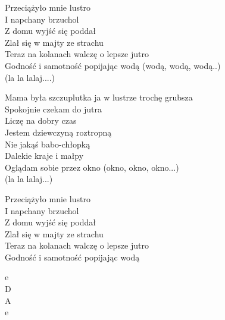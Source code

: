 \begin{text}
	Przeciążyło mnie lustro\\
	I napchany brzuchol\\
	Z domu wyjść się poddał\\
	Zlał się w majty ze strachu\\
	Teraz na kolanach walczę o lepsze jutro\\
	Godność i samotność popijając wodą (wodą, wodą, wodą..)\\
	(la la lalaj....)

	Mama była szczuplutka ja w lustrze trochę grubsza\\
	Spokojnie czekam do jutra\\
	Liczę na dobry czas\\
	Jestem dziewczyną roztropną\\
	Nie jakąś babo-chłopką\\
	Dalekie kraje i małpy\\
	Oglądam sobie przez okno (okno, okno, okno...)\\
	(la la lalaj...)

	Przeciążyło mnie lustro\\
	I napchany brzuchol\\
	Z domu wyjść się poddał\\
	Zlał się w majty ze strachu\\
	Teraz na kolanach walczę o lepsze jutro\\
	Godność i samotność popijając wodą
\end{text}
\begin{chord}
	e\\
	D\\
	A\\
	e
\end{chord}
